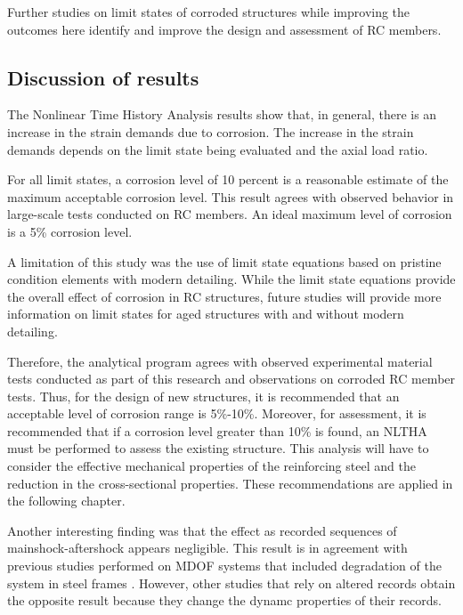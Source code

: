 Further studies on limit states of corroded structures while improving the outcomes here identify and improve the design and assessment of RC members.

\subsection{Discussion of results}

The Nonlinear Time History Analysis results show that, in general, there is an increase in the strain demands due to corrosion. The increase in the strain demands depends on the limit state being evaluated and the axial load ratio. 

For all limit states, a corrosion level of 10 percent is a reasonable estimate of the maximum acceptable corrosion level. This result agrees with observed behavior in large-scale tests conducted on RC members. An ideal maximum level of corrosion is a 5\% corrosion level.

A limitation of this study was the use of limit state equations based on pristine condition elements with modern detailing. While the limit state equations provide the overall effect of corrosion in RC structures, future studies will provide more information on limit states for aged structures with and without modern detailing.

Therefore, the analytical program agrees with observed experimental material tests conducted as part of this research and observations on corroded RC member tests. Thus, for the design of new structures, it is recommended that an acceptable level of corrosion range is 5\%-10\%. Moreover, for assessment, it is recommended that if a corrosion level greater than 10\% is found, an NLTHA must be performed to assess the existing structure. This analysis will have to consider the effective mechanical properties of the reinforcing steel and the reduction in the cross-sectional properties. These recommendations are applied in the following chapter. 

Another interesting finding was that the effect as recorded sequences of mainshock-aftershock appears negligible. This result is in agreement with previous studies performed on MDOF systems that included degradation of the system in steel frames \cite{Ruiz-Garcia2011}. However, other studies that rely on altered records obtain the opposite result because they change the dynamc properties of their records.